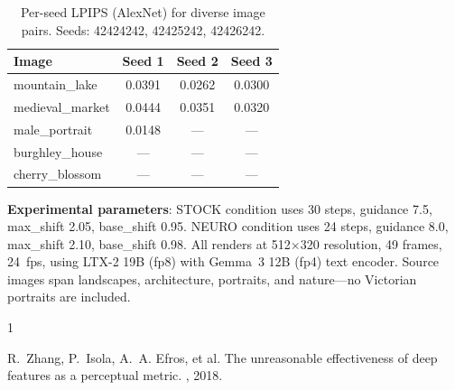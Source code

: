 \documentclass[10pt,twocolumn,letterpaper]{article}
\begin{document}
\begin{table}[h]
\centering
\small
\begin{tabular}{lccc}
\toprule
\textbf{Image} & \textbf{Seed 1} & \textbf{Seed 2} & \textbf{Seed 3} \\
\midrule
mountain\_lake & 0.0391 & 0.0262 & 0.0300 \\
medieval\_market & 0.0444 & 0.0351 & 0.0320 \\
male\_portrait & 0.0148 & --- & --- \\
burghley\_house & --- & --- & --- \\
cherry\_blossom & --- & --- & --- \\
\bottomrule
\end{tabular}
\caption{Per-seed LPIPS (AlexNet) for diverse image pairs. Seeds: 42424242, 42425242, 42426242.}
\label{tab:diverse_perseed}
\end{table}

\textbf{Experimental parameters}: STOCK condition uses 30 steps, guidance 7.5, max\_shift 2.05, base\_shift 0.95. NEURO condition uses 24 steps, guidance 8.0, max\_shift 2.10, base\_shift 0.98. All renders at 512$\times$320 resolution, 49 frames, 24~fps, using LTX-2 19B (fp8) with Gemma~3 12B (fp4) text encoder. Source images span landscapes, architecture, portraits, and nature---no Victorian portraits are included.

{\small

\makeatletter{}\makeatother
\begin{thebibliography}{1}

R.~Zhang, P.~Isola, A.~A. Efros, et al.
\newblock The unreasonable effectiveness of deep features as a perceptual metric.
, 2018.

\end{thebibliography}
}
\end{document}
